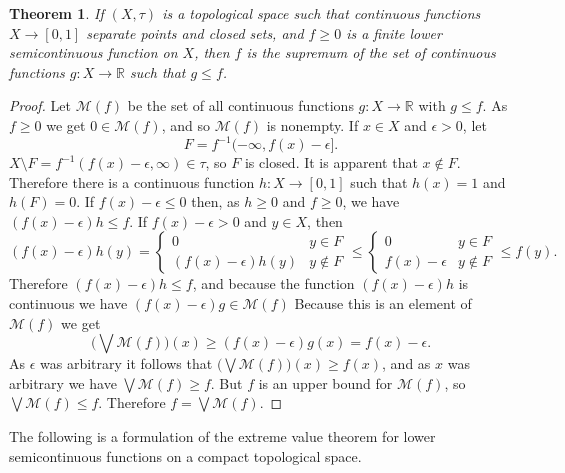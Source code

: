 \documentclass{article}
\newtheorem{theorem}{Theorem}
\theoremstyle{definition}
\begin{document}
\begin{theorem}
If $(X,\tau)$ is a  topological space such that continuous functions $X \to [0,1]$ separate points and closed sets, and $f \geq 0$ is a finite  lower semicontinuous function on $X$, then $f$ is the supremum of the set of continuous functions $g: X \to \mathbb{R}$  such that $g \leq f$.
\label{positiveLSC}
\end{theorem}
\begin{proof}
Let $\mathscr{M}(f)$ be the set of all continuous functions $g:X \to \mathbb{R}$ with $g \leq f$. As $f \geq 0$ we get $0 \in \mathscr{M}(f)$, and so $\mathscr{M}(f)$ is nonempty. 
If $x \in X$ and $\epsilon>0$, let 
\[
F=f^{-1}(-\infty, f(x)-\epsilon].
\]
$X\setminus F = f^{-1}(f(x)-\epsilon,\infty) \in \tau$, so $F$ is closed. It is apparent that $x \not \in F$. Therefore there is a continuous function $h:X \to [0,1]$ such that
$h(x)=1$ and $h(F)=0$.  If $f(x)-\epsilon \leq 0$ then, as $h \geq 0$  and $f \geq 0$, we have $(f(x)-\epsilon)h \leq f$.
If $f(x)-\epsilon>0$ and $y \in X$, then
\[
(f(x)-\epsilon)h(y) 
=
\begin{cases}
0&y \in F\\
(f(x)-\epsilon)h(y)&y \not \in F
\end{cases}
\leq
\begin{cases}
0&y \in F\\
f(x)-\epsilon&y \not \in F
\end{cases}
\leq 
f(y).
\]
Therefore $(f(x)-\epsilon)h \leq f$, and because 
the function $(f(x)-\epsilon)h$ is continuous we have
$(f(x)-\epsilon)g \in \mathscr{M}(f)$
Because this is an element of $\mathscr{M}(f)$ we get
\[
\Big( \bigvee \mathscr{M}(f) \Big)(x) \geq (f(x)-\epsilon)g(x) = f(x)-\epsilon.
\]
As $\epsilon$ was arbitrary it follows that $\Big( \bigvee \mathscr{M}(f) \Big)(x) \geq f(x)$, and as $x$ was arbitrary we have $\bigvee \mathscr{M}(f) \geq f$.
But $f$ is an upper bound for $\mathscr{M}(f)$, so $\bigvee \mathscr{M}(f) \leq f$. Therefore $f=\bigvee \mathscr{M}(f)$. 
\end{proof}


The following is a formulation of the extreme value theorem for lower semicontinuous functions on a compact topological space. 
\end{document}
